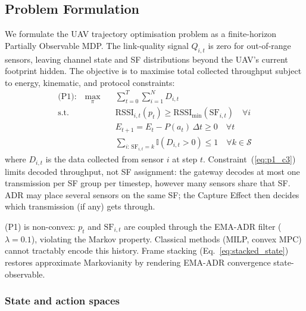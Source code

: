 \subsection{Problem Formulation}

We formulate the UAV trajectory optimisation problem as a
finite-horizon Partially Observable MDP. The link-quality signal
$Q_{i,t}$ is zero for out-of-range sensors, leaving channel state
and SF distributions beyond the UAV's current footprint hidden.
The objective is to maximise total collected throughput subject to
energy, kinematic, and protocol constraints:
\begin{align}
    \text{(P1):} \quad \max_{\pi} \quad & \sum_{t=0}^{T} \sum_{i=1}^{N} D_{i,t}
        \label{eq:p1_obj} \\
    \text{s.t.} \quad
    & \mathrm{RSSI}_{i,t}(p_t) \geq \mathrm{RSSI}_{\min}(\mathrm{SF}_{i,t})
        \quad \forall i \label{eq:p1_c1} \\
    & E_{t+1} = E_t - P(a_t)\,\Delta t \geq 0 \quad \forall t \label{eq:p1_c2} \\
    & \sum_{i:\,\mathrm{SF}_{i,t}=k} \mathbb{I}(D_{i,t}>0) \leq 1
        \quad \forall k \in \mathcal{S} \label{eq:p1_c3}
\end{align}
where $D_{i,t}$ is the data collected from sensor $i$ at step $t$.
Constraint~(\ref{eq:p1_c3}) limits decoded throughput, not SF
assignment: the gateway decodes at most one transmission per SF group
per timestep, however many sensors share that SF. ADR may place
several sensors on the same SF; the Capture Effect then decides which
transmission (if any) gets through.

(P1) is non-convex: $p_t$ and $\mathrm{SF}_{i,t}$ are coupled through
the EMA-ADR filter ($\lambda = 0.1$), violating the Markov property.
Classical methods (MILP, convex MPC) cannot tractably encode this
history. Frame stacking (Eq.~\ref{eq:stacked_state}) restores
approximate Markovianity by rendering EMA-ADR convergence
state-observable.

\subsubsection{State and action spaces}

